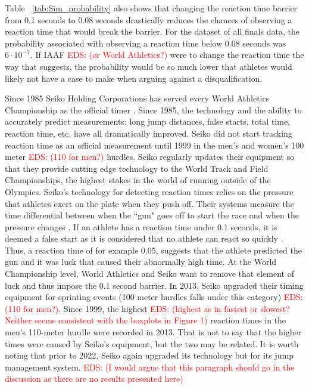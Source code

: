 \documentclass[12pt, letterpaper, titlepage]{article}
\newcommand{\eds}[1]{\textcolor{red}{EDS: (#1)}}
\begin{document}
Table ~\ref{tab:Sim_probability} also shows that changing the reaction time 
barrier from 0.1 seconds to 0.08 seconds drastically reduces the chances of 
observing a reaction time that would break the barrier.  For the dataset of all 
finals data, the probability
associated with observing a reaction time below 0.08 seconds was $6\cdot10^{-7}$.
If IAAF \eds{or World Athletics?} were to change the reaction time the way that 
\citet{komi2009iaaf}
suggests, the probability would be so much lower that athletes would likely not
have a case to make when arguing against a disqualification.


Since 1985 Seiko Holding Corporations has served every World Athletics 
Championship as the official timer \citep{wa2022seiko}.  Since 1985, the 
technology and the ability
to accurately predict measurements: long jump distances, false starts, total 
time, reaction time, etc. have all dramatically improved.  Seiko did not start 
tracking reaction time as an official measurement until 1999 in the men's and 
women's 100 meter \eds{110 for men?} hurdles. 
Seiko regularly updates their equipment so that they provide cutting edge
technology to the World Track and Field Championships, the highest stakes in the 
world of running outside of the Olympics. Seiko's technology for detecting 
reaction times relies on the pressure that athletes exert on the plate when they 
push off.  Their systems measure the time differential
between when the ``gun" goes off to start the race and when the pressure changes 
\citep{wa2022seiko}.  If an athlete has a reaction time under 0.1 seconds, it 
is deemed a 
false start as it is considered that no athlete can react so quickly 
\citep{Seiko-Timing}.  Thus, a reaction time of for example 0.05, suggests that 
the athlete predicted the gun and it was luck that caused their abnormally high 
time.  At the World Championship level, World Athletics and Seiko want to remove 
that element of luck and thus impose the 0.1 second barrier. In 2013, Seiko 
upgraded their timing equipment for sprinting events (100 meter hurdles falls 
under this category) \citep{wa2013backtage} \eds{110 for men?}. Since 1999, the
 highest \eds{highest as in fastest or slowest? Neither seems consistent with 
the boxplots in Figure 1} reaction 
times in the men's 110-meter hurdle were recorded in 2013.  That is not to say
 that the higher 
times were caused by Seiko's equipment, but the two may be related.  It is worth 
noting that prior
to 2022, Seiko again upgraded its technology but for its jump management system.
\eds{I would argue that this paragraph should go in the discussion as there are 
no results presented here}
\end{document}
